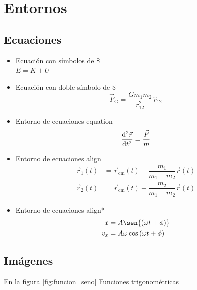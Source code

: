 \section{Entornos}
\subsection{Ecuaciones}

\begin{itemize}
    \item Ecuación con símbolos de \$ \\ $ E = K + U $ %
    \item Ecuación con doble símbolo de \$ $$ \vec{F}_{\text{G}} = \dfrac{G m_1 m_2}{r^2_{12}} \, \hat{r}_{12} $$ %
    \item Entorno de ecuaciones \textsf{equation}
    \begin{equation}
         \dfrac{\mathrm{d}^2 \vec{r}}{\mathrm{d} t^2} = \frac{\vec{F}}{m} \\%
    \end{equation}
    \item Entorno de ecuaciones \textsf{align}
    \begin{align}
        \vec{r}_1 \left( t \right) &= \vec{r}_{\text{cm}} \left( t \right) + \dfrac{m_1}{m_1+m_2} \vec{r} \left( t \right)\\ \vec{r}_2 \left( t \right) &= \vec{r}_{\text{cm}} \left( t \right) - \dfrac{m_2}{m_1+m_2} \vec{r} \left( t \right) 
    \end{align}
    \item Entorno de ecuaciones \textsf{align*}
    \begin{align*}
        x &= A  \sen{ \left( \omega t + \phi \right)} \\
        v_x &= A \omega \cos{ \left( \omega t + \phi \right)} 
    \end{align*}
\end{itemize}

\newpage
\subsection{Imágenes}
    En la figura \ref{fig:funcion_seno}     Funciones trigonométricas

